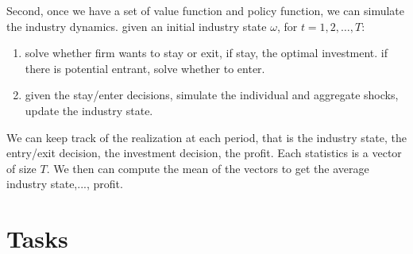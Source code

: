 \documentclass[12pt]{article}[margin=1in]
\begin{document}
Second, once we have a set of value function and policy function, we can simulate the industry dynamics.
given an initial industry state $\omega$, for $t=1,2,\ldots,T$:
\begin{enumerate}
    \item solve whether firm wants to stay or exit, if stay, the optimal investment. if there is potential entrant, solve whether to enter. 
    \item given the stay/enter decisions, simulate the individual and aggregate shocks, update the industry state.
\end{enumerate}
We can keep track of the realization at each period, that is the industry state, the entry/exit decision, the investment decision, the profit. Each statistics is a vector of size $T$. We then can compute the mean of the vectors to get the average industry state,..., profit.


\section{Tasks}

\newpage

\end{document}
